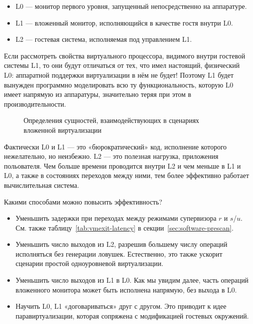 \begin{itemize}
\item L0 — монитор первого уровня, запущенный непосредственно на аппаратуре.
\item L1 — вложенный монитор, исполняющийся в качестве гостя внутри L0.
\item L2 — гостевая система, исполняемая под управлением L1.
\end{itemize}

Если рассмотреть свойства виртуального процессора, видимого внутри гостевой системы L1, то они будут отличаться от тех, что имел настоящий, физический L0: аппаратной поддержки виртуализации в нём не будет! Поэтому L1 будет вынужден программно моделировать всю ту функциональность, которую L0 имеет напрямую из аппаратуры, значительно теряя при этом в производительности.

\begin{figure}[htb]
    \centering
    \caption[Сценарий вложенной виртуализации]{Определения сущностей, взаимодействующих в сценариях вложенной виртуализации}
    \label{fig:nested-virt}
\end{figure}

Фактически L0 и L1 — это «бюрократический» код, исполнение которого нежелательно, но неизбежно. L2 — это полезная нагрузка, приложения польователя. Чем больше времени проводится внутри L2 и чем меньше в L1 и L0, а также в состояниях переходов между ними, тем более эффективно работает вычислительная система.

Какими способами можно повысить эффективность?

\begin{itemize}
\item Уменьшить задержки при переходах между режимами супервизора $r$ и $s$/$u$. См. также таблицу~\ref{tab:vmexit-latency} в секции~\ref{sec:software-prescan}.
\item Уменьшить число выходов из L2, разрешив большему числу операций исполняться без генерации ловушек. Естественно, это также ускорит сценарии простой одноуровневой виртуализации.
\item Уменьшить число выходов из L1 в L0. Как мы увидим далее, часть операций вложенного монитора может быть исполнена напрямую, без выхода в L0.
\item Научить L0, L1 «договариваться» друг с другом. Это приводит к идее паравиртуализации, которая сопряжена с модификацией гостевых окружений.
\end{itemize}

